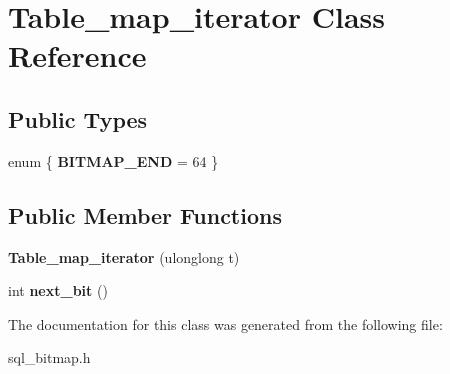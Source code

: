 \hypertarget{classTable__map__iterator}{}\section{Table\+\_\+map\+\_\+iterator Class Reference}
\label{classTable__map__iterator}
\subsection*{Public Types}
\begin{DoxyCompactItemize}
\item 
\mbox{\label{classTable__map__iterator_a7db3ab87da5ee6b274f800db02bfb2f9}} 
enum \{ {\bfseries B\+I\+T\+M\+A\+P\+\_\+\+E\+ND} = 64
 \}
\end{DoxyCompactItemize}
\subsection*{Public Member Functions}
\begin{DoxyCompactItemize}
\item 
\mbox{\label{classTable__map__iterator_a2a986c4479cbd8330ebae85b400c6f55}} 
{\bfseries Table\+\_\+map\+\_\+iterator} (ulonglong t)
\item 
\mbox{\label{classTable__map__iterator_a0b118cda11313aab47f151da7f533051}} 
int {\bfseries next\+\_\+bit} ()
\end{DoxyCompactItemize}


The documentation for this class was generated from the following file\+:\begin{DoxyCompactItemize}
\item 
sql\+\_\+bitmap.\+h\end{DoxyCompactItemize}
